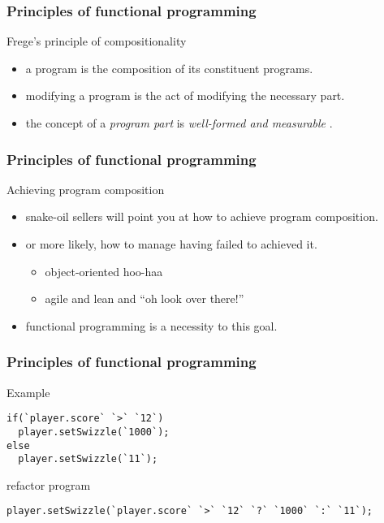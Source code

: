 \begin{frame}
\frametitle{Principles of functional programming}
\begin{block}{Frege's principle of compositionality \cite{janssen2001frege}}
\begin{itemize}
\item<1-> a program is the composition of its constituent programs.
\item<2-> modifying a program is the act of modifying the necessary part.
\item<3-> the concept of a \emph{program part} is \emph{well-formed and measurable} \cite{hughes1989functional}.
\end{itemize}
\end{block}
\end{frame}

\begin{frame}
\frametitle{Principles of functional programming}
\begin{block}{Achieving program composition}
\begin{itemize}
\item<1-> snake-oil sellers will point you at how to achieve program composition.
\item<2-> or more likely, how to manage having failed to achieved it.
          \begin{itemize}
          \item \tiny{object-oriented hoo-haa}
          \item \tiny{agile and lean and ``oh look over there!''}
          \end{itemize}
\item<3-> functional programming is a necessity to this goal.
\end{itemize}
\end{block}
\end{frame}

\begin{frame}[fragile]
\frametitle{Principles of functional programming}
\begin{block}{Example}
\begin{lstlisting}[style=java,mathescape,basicstyle=\scriptsize]
if(`player.score` `>` `12`)
  player.setSwizzle(`1000`);
else
  player.setSwizzle(`11`);
\end{lstlisting}
\end{block}
\begin{block}{refactor program}
\begin{lstlisting}[style=java,mathescape,basicstyle=\scriptsize]
player.setSwizzle(`player.score` `>` `12` `?` `1000` `:` `11`);
\end{lstlisting}
\end{block}
\end{frame}

